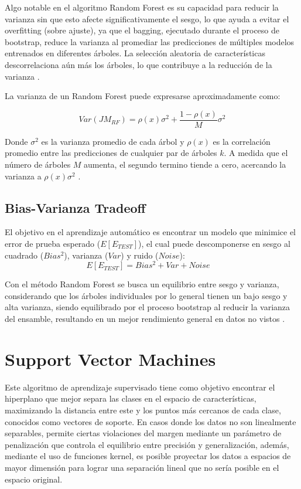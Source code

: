 			Algo notable en el algoritmo Random Forest es su capacidad para reducir la varianza sin que esto afecte significativamente el sesgo, lo que ayuda a evitar el overfitting (sobre ajuste), ya que el bagging, ejecutado durante el proceso de bootstrap, reduce la varianza al promediar las predicciones de múltiples modelos entrenados en diferentes árboles. La selección aleatoria de características descorrelaciona aún más los árboles, lo que contribuye a la reducción de la varianza \citep{breiman2001,veirana2021}.
			
			La varianza de un Random Forest puede expresarse aproximadamente como:
			
				\begin{equation}
					Var ( JM_{RF} ) = \rho(x)\sigma^2 + \frac{1 - \rho(x)}{M}\sigma^2
				\end{equation} 
				
			Donde $\sigma^2$ es la varianza promedio de cada árbol y $\rho(x)$ es la correlación promedio entre las predicciones de cualquier par de árboles $k$. A medida que el número de árboles $M$ aumenta, el segundo termino tiende a cero, acercando la varianza a $\rho(x)\sigma^2$ \citep{breiman2001,veirana2021}.
			
		\subsection{Bias-Varianza Tradeoff}
		
		El objetivo en el aprendizaje automático es encontrar un modelo que minimice el error de prueba esperado ($E[E_{TEST}]$)\citep{breiman2001}, el cual puede descomponerse en sesgo al cuadrado ($Bias^2$), varianza ($Var$) y ruido ($Noise$): $$E[E_{TEST}] = Bias^2 + Var + Noise \quad$$
		
		Con el método Random Forest se busca un equilibrio entre sesgo y varianza, considerando que los árboles individuales por lo general tienen un bajo sesgo y alta varianza, siendo equilibrado por el proceso bootstrap al reducir la varianza del ensamble, resultando en un mejor rendimiento general en datos no vistos \citep{breiman2001}.
		
		
	\section{Support Vector Machines} 
	
	Este algoritmo de aprendizaje supervisado tiene como objetivo encontrar el hiperplano que mejor separa las clases en el espacio de características, maximizando la distancia entre este y los puntos más cercanos de cada clase, conocidos como vectores de soporte. En casos donde los datos no son linealmente separables, permite ciertas violaciones del margen mediante un parámetro de penalización que controla el equilibrio entre precisión y generalización, además, mediante el uso de funciones kernel, es posible proyectar los datos a espacios de mayor dimensión para lograr una separación lineal que no sería posible en el espacio original\citep{james2013, veirana2021}.
	
